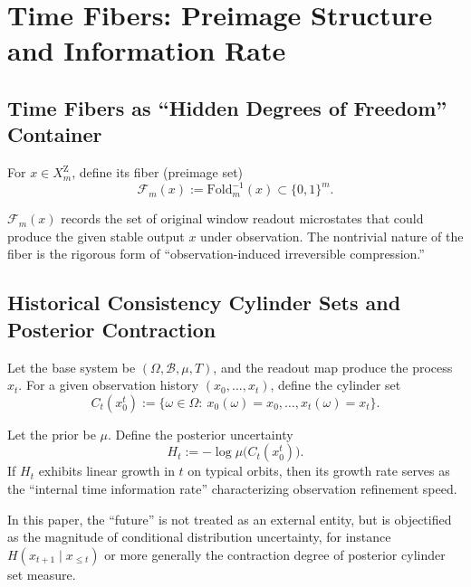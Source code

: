 \section{Time Fibers: Preimage Structure and Information Rate}

\subsection{Time Fibers as ``Hidden Degrees of Freedom'' Container}

\begin{definition}\label{def:time-fiber}
For $x\in X_m^{\mathrm Z}$, define its fiber (preimage set)
\[
\mathcal{F}_m(x):=\mathrm{Fold}_m^{-1}(x)\subset\{0,1\}^m.
\]
\end{definition}

\begin{remark}
$\mathcal{F}_m(x)$ records the set of original window readout microstates that could produce the given stable output $x$ under observation. The nontrivial nature of the fiber is the rigorous form of ``observation-induced irreversible compression.''
\end{remark}

\subsection{Historical Consistency Cylinder Sets and Posterior Contraction}

\begin{definition}\label{def:cylinder-set}
Let the base system be $(\Omega,\mathcal{B},\mu,T)$, and the readout map produce the process $x_t$. For a given observation history $(x_0,\dots,x_t)$, define the cylinder set
\[
C_t(x_0^t):=\{\omega\in\Omega:\ x_0(\omega)=x_0,\dots,x_t(\omega)=x_t\}.
\]
\end{definition}

\begin{definition}\label{def:internal-time-scale}
Let the prior be $\mu$. Define the posterior uncertainty
\[
H_t:=-\log\mu\bigl(C_t(x_0^t)\bigr).
\]
If $H_t$ exhibits linear growth in $t$ on typical orbits, then its growth rate serves as the ``internal time information rate'' characterizing observation refinement speed.
\end{definition}

\begin{remark}
In this paper, the ``future'' is not treated as an external entity, but is objectified as the magnitude of conditional distribution uncertainty, for instance
$
H(x_{t+1}\mid x_{\le t})
$
or more generally the contraction degree of posterior cylinder set measure.
\end{remark}

